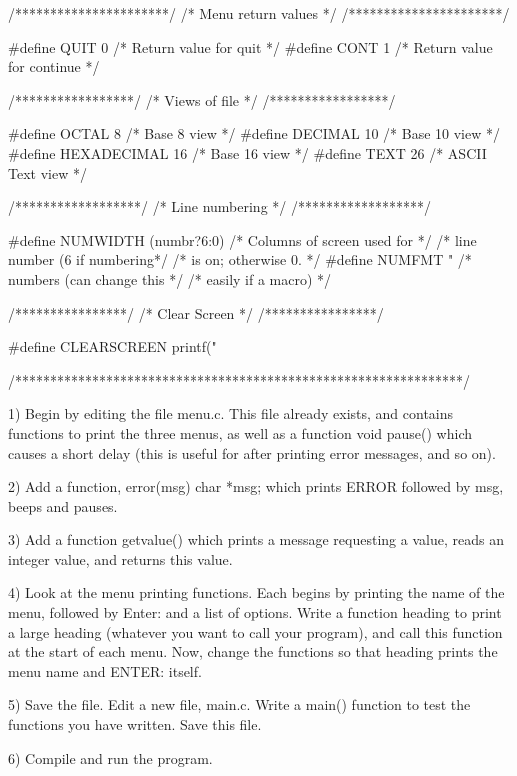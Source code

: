 /**********************/
/* Menu return values */
/**********************/

#define QUIT        0         /* Return value for quit      */
#define CONT        1         /* Return value for continue  */

/*****************/
/* Views of file */
/*****************/

#define OCTAL       8         /* Base 8 view           */
#define DECIMAL     10        /* Base 10 view          */
#define HEXADECIMAL 16        /* Base 16 view          */
#define TEXT        26        /* ASCII Text view       */

/******************/
/* Line numbering */
/******************/

#define NUMWIDTH    (numbr?6:0)    /* Columns of screen used for */
                                   /* line number (6 if numbering*/
                                   /* is on; otherwise 0.        */
#define NUMFMT      "%
                                   /* numbers (can change this   */
                                   /* easily if a macro)         */

/****************/
/* Clear Screen */
/****************/

#define CLEARSCREEN printf("%

/****************************************************************/


1) Begin  by editing  the file menu.c. This file already exists, and contains
functions to  print the three menus, as well as a function void pause() which
causes a  short delay  (this is useful for after printing error messages, and
so on).

2) Add  a function, error(msg) char *msg; which prints ERROR followed by msg,
beeps and pauses.

3) Add a function getvalue() which prints a message requesting a value, reads
an integer value, and returns this value.

4) Look  at the  menu printing functions. Each begins by printing the name of
the menu,  followed by Enter: and a list of options. Write a function heading
to print  a large  heading (whatever you want to call your program), and call
this function  at the  start of  each menu. Now, change the functions so that
heading prints the menu name and ENTER: itself.

5) Save  the file.  Edit a  new file, main.c. Write a main() function to test
the functions you have written. Save this file.

6) Compile and run the program.
